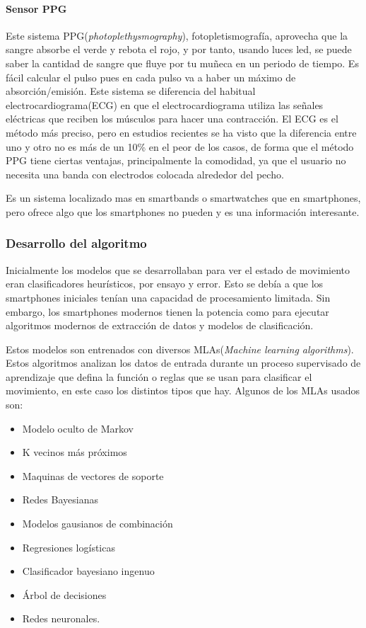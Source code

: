 \documentclass[12pt]{article}
\numberwithin{equation}{section}
\begin{document}
\paragraph{Sensor PPG}
Este sistema PPG(\textit{photoplethysmography}), fotopletismografía, aprovecha que la sangre absorbe el verde y rebota el rojo, y por tanto, usando luces led, se puede saber la cantidad de sangre que fluye por tu muñeca en un periodo de tiempo. Es fácil calcular el pulso pues en cada pulso va a haber un máximo de absorción/emisión. Este sistema se diferencia del habitual electrocardiograma(ECG) en que el electrocardiograma utiliza las señales eléctricas que reciben los músculos para hacer una contracción. El ECG es el método más preciso, pero en estudios recientes se ha visto que la diferencia entre uno y otro no es más de un 10\% \cite{77489867} en el peor de los casos, de forma que el método PPG tiene ciertas ventajas, principalmente la comodidad, ya que el usuario no necesita una banda con electrodos colocada alrededor del pecho.

Es un sistema localizado mas en smartbands o smartwatches que en smartphones, pero ofrece algo que los smartphones no pueden y es una información interesante.

\subsubsection{Desarrollo del algoritmo}
Inicialmente los modelos que se desarrollaban para ver el estado de movimiento eran clasificadores heurísticos, por ensayo y error. Esto se debía a que los smartphones iniciales tenían una capacidad de procesamiento limitada. Sin embargo, los smartphones modernos tienen la potencia como para ejecutar algoritmos modernos de extracción de datos y modelos de clasificación.

Estos modelos son entrenados con diversos MLAs(\textit{Machine learning algorithms}). Estos algoritmos analizan los datos de entrada durante un proceso supervisado de aprendizaje que defina la función o reglas que se usan para clasificar el movimiento, en este caso los distintos tipos que hay. Algunos de los MLAs usados son:

\begin{itemize}
\item Modelo oculto de Markov
\item K vecinos más próximos
\item Maquinas de vectores de soporte
\item Redes Bayesianas
\item Modelos gausianos de combinación
\item Regresiones logísticas
\item Clasificador bayesiano ingenuo
\item Árbol de decisiones
\item Redes neuronales.
\end{itemize}
\end{document}
